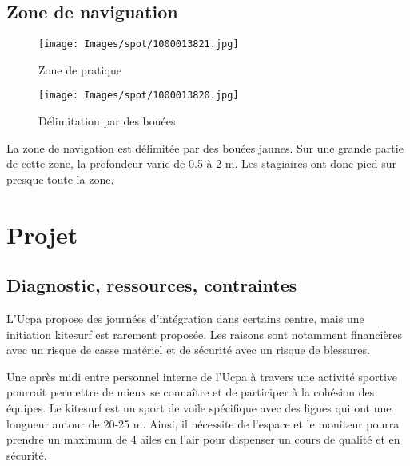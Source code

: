 \documentclass[11pt,a4paper]{report}
\begin{document}

\subsection{Zone de naviguation}
\begin{figure}
\begin{minipage}{0.4\textwidth}
\texttt{[image: Images/spot/1000013821.jpg]} 
\caption{Zone de pratique}
\end{minipage}
\hfill
\begin{minipage}{0.4\textwidth}
\texttt{[image: Images/spot/1000013820.jpg]} 
\caption{Délimitation par des bouées}
\end{minipage}
\end{figure}
La zone de navigation est délimitée par des bouées jaunes.
Sur une grande partie de cette zone, la profondeur varie de 0.5 à 2 m.
Les stagiaires ont donc pied sur presque toute la zone.
\section{Projet}
\subsection{Diagnostic, ressources, contraintes}

L'Ucpa propose des journées d'intégration dans certains centre, mais
une initiation kitesurf est rarement proposée. Les raisons sont notamment
financières avec un risque de casse matériel et de sécurité avec un risque
de blessures.


Une après midi entre personnel interne de l'Ucpa à travers une 
activité sportive pourrait permettre  de mieux se connaître et de participer
à la cohésion des équipes.
Le kitesurf est un sport de voile spécifique avec des  lignes  qui ont
une longueur autour de  20-25 m. Ainsi, il nécessite de l'espace
et le moniteur pourra prendre un maximum de 4 ailes en l'air
pour dispenser un cours de qualité et en sécurité. 
\end{document}
